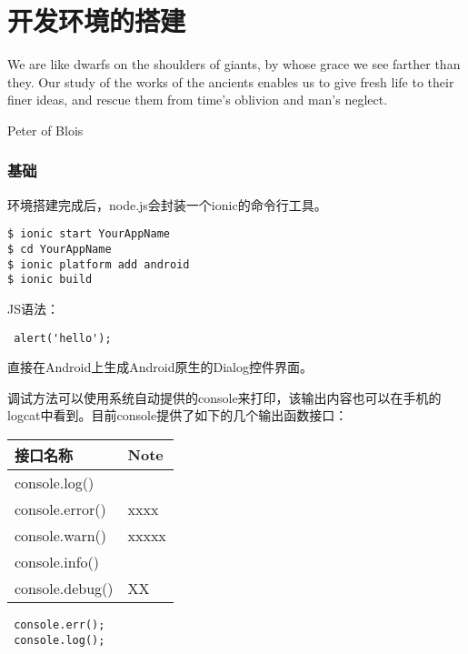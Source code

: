 \chapter{开发环境的搭建}

\epigraph{We are like dwarfs on the shoulders of giants, by whose grace we see farther than they. Our study of the works of the ancients enables us to give fresh life to their finer ideas, and rescue them from time’s oblivion and man’s neglect.}{Peter of Blois}

\subsection{基础}

环境搭建完成后，node.js会封装一个ionic的命令行工具。

\begin{lstlisting}
$ ionic start YourAppName
$ cd YourAppName
$ ionic platform add android
$ ionic build
\end{lstlisting}


JS语法：
\begin{lstlisting}
 alert('hello');
\end{lstlisting}

直接在Android上生成Android原生的Dialog控件界面。


调试方法可以使用系统自动提供的console来打印，该输出内容也可以在手机的logcat中看到。目前console提供了如下的几个输出函数接口：

\bgroup
\def\arraystretch{1.15} 
\begin{tabular}{|l|l|}
{接口名称} & {Note}  \\
\hline
 {console.log()} & {} \\
 {console.error()} & {xxxx}\\
 {console.warn()} & {xxxxx}\\
 {console.info()} & {} \\
 {console.debug()} & {XX} \\
\end{tabular}
\egroup

\begin{lstlisting}
 console.err();
 console.log();
\end{lstlisting}
